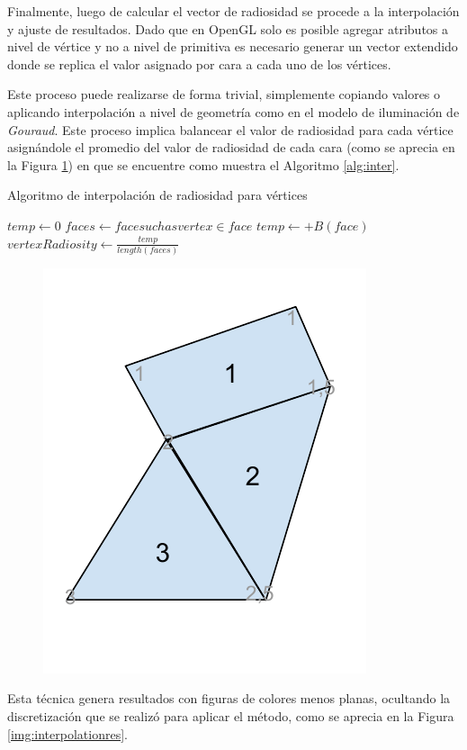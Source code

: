 Finalmente, luego de calcular el vector de radiosidad se procede a la interpolación y ajuste de resultados. Dado que en OpenGL solo es posible agregar atributos a nivel de vértice y no a nivel de primitiva es necesario generar un vector extendido donde se replica el valor asignado por cara a cada uno de los vértices.

Este proceso puede realizarse de forma trivial, simplemente copiando valores o aplicando interpolación a nivel de geometría como en el modelo de iluminación de \textit{Gouraud}. Este proceso implica balancear el valor de radiosidad para cada vértice asignándole el promedio del valor de radiosidad de cada cara (como se aprecia en la Figura \ref{img:interpolation}) en que se encuentre como muestra el Algoritmo \ref{alg:inter}.

\begin{algorithm}
	\caption{Algoritmo de interpolación de radiosidad para vértices}
	\label{alg:inter}
	\begin{algorithmic}
				\State $temp \gets 0$
				\State $faces \gets {face such as vertex \in face}$
					\State $temp \gets +B(face)$
				\EndLoop
				\State $vertexRadiosity \gets \frac{temp}{length(faces)}$
			\EndLoop
		\EndFunction
	\end{algorithmic}
\end{algorithm}

\begin{figure}[H]
	\centering
	\includegraphics[width=.3\linewidth]{assets/Interpolation}
	\label{img:interpolation}
\end{figure}

Esta técnica genera resultados con figuras de colores menos planas, ocultando la discretización que se realizó para aplicar el método, como se aprecia en la Figura \ref{img:interpolationres}.

